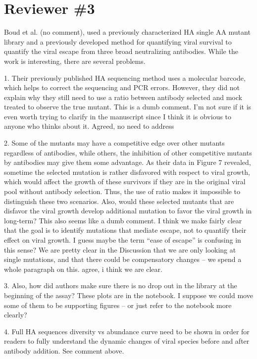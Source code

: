 \documentclass[11pt, oneside]{article}   	%
\begin{document}
\section*{Reviewer \#3} 
Boud et al.{\color{blue} (no comment)}, used a previously characterized HA single AA mutant library and a previously developed method for quantifying viral survival to quantify the viral escape from three broad neutralizing antibodies. While the work is interesting, there are several problems.

1. Their previously published HA sequencing method uses a molecular barcode, which helps to correct the sequencing and PCR errors. However, they did not explain why they still need to use a ratio between antibody selected and mock treated to observe the true mutant.
{\color{red} 
This is a dumb comment. 
I'm not sure if it is even worth trying to clarify in the manuscript since I think it is obvious to anyone who thinks about it.
}
{\color{blue} Agreed, no need to address}

2. Some of the mutants may have a competitive edge over other mutants regardless of antibodies, while others, the inhibition of other competitive mutants by antibodies may give them some advantage. As their data in Figure 7 revealed, sometime the selected mutation is rather disfavored with respect to viral growth, which would affect the growth of these survivors if they are in the original viral pool without antibody selection. Thus, the use of ratio makes it impossible to distinguish these two scenarios. Also, would these selected mutants that are disfavor the viral growth develop additional mutation to favor the viral growth in long-term?
{\color{red}
This also seems like a dumb comment.
I think we make fairly clear that the goal is to identify mutations that mediate escape, not to quantify their effect on viral growth.
I guess maybe the term ``ease of escape'' is confusing in this sense?
We are pretty clear in the Discussion that we are only looking at single mutations, and that there could be compensatory changes -- we spend a whole paragraph on this.
}
{\color{blue} agree, i think we are clear. }

3. Also, how did authors make sure there is no drop out in the library at the beginning of the assay?
{\color{red}
These plots are in the notebook. 
I suppose we could move some of them to be supporting figures -- or just refer to the notebook more clearly?
}

4. Full HA sequences diversity vs abundance curve need to be shown in order for readers to fully understand the dynamic changes of viral species before and after antibody addition.
{\color{red}
See comment above.
}
\end{document}
